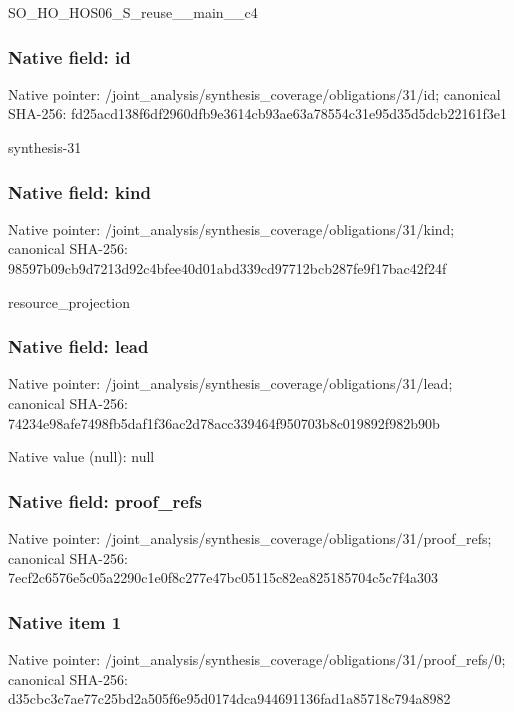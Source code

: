 \documentclass[10pt,a4paper]{article}
\begin{document}
\begingroup\raggedright\sloppy SO\_\allowbreak{}HO\_\allowbreak{}HOS06\_\allowbreak{}S\_\allowbreak{}reuse\_\allowbreak{}\_\allowbreak{}main\_\allowbreak{}\_\allowbreak{}c4\par\endgroup

\subsubsection{Native field: id}
Native pointer: /joint\_\allowbreak{}analysis/synthesis\_\allowbreak{}coverage/obligations/31/id; canonical SHA-256: fd25acd138f6df2960dfb9e3614cb93ae63a78554c31e95d35d5dcb22161f3e1

\begingroup\raggedright\sloppy synthesis-31\par\endgroup

\subsubsection{Native field: kind}
Native pointer: /joint\_\allowbreak{}analysis/synthesis\_\allowbreak{}coverage/obligations/31/kind; canonical SHA-256: 98597b09cb9d7213d92c4bfee40d01abd339cd97712bcb287fe9f17bac42f24f

\begingroup\raggedright\sloppy resource\_\allowbreak{}projection\par\endgroup

\subsubsection{Native field: lead}
Native pointer: /joint\_\allowbreak{}analysis/synthesis\_\allowbreak{}coverage/obligations/31/lead; canonical SHA-256: 74234e98afe7498fb5daf1f36ac2d78acc339464f950703b8c019892f982b90b

Native value (null): null

\subsubsection{Native field: proof\_\allowbreak{}refs}
Native pointer: /joint\_\allowbreak{}analysis/synthesis\_\allowbreak{}coverage/obligations/31/proof\_\allowbreak{}refs; canonical SHA-256: 7ecf2c6576e5c05a2290c1e0f8c277e47bc05115c82ea825185704c5c7f4a303

\subsubsection{Native item 1}
Native pointer: /joint\_\allowbreak{}analysis/synthesis\_\allowbreak{}coverage/obligations/31/proof\_\allowbreak{}refs/0; canonical SHA-256: d35cbc3c7ae77c25bd2a505f6e95d0174dca944691136fad1a85718c794a8982
\end{document}
